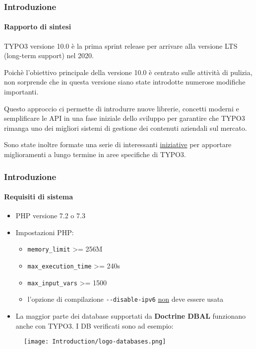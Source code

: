 \begin{frame}[fragile]
	\frametitle{Introduzione}
	\framesubtitle{Rapporto di sintesi}

	\small
		TYPO3 versione 10.0 è la prima sprint release per arrivare alla versione LTS
		(long-term support) nel 2020.

		\vspace{0.2cm}

		Poichè l'obiettivo principale della versione 10.0 è centrato sulle attività di pulizia, non
		sorprende che in questa versione siano state introdotte numerose modifiche importanti.

		\vspace{0.2cm}

		Questo approccio ci permette di introdurre nuove librerie, concetti moderni e
		semplificare le API in una fase iniziale dello sviluppo per garantire che TYPO3
		rimanga uno dei migliori sistemi  di gestione dei contenuti aziendali sul mercato.

		\vspace{0.2cm}

		Sono state inoltre formate una serie di interessanti
		\href{https://typo3.org/community/teams/typo3-development/initiatives/}{iniziative}
		per apportare miglioramenti a lungo termine in aree specifiche di TYPO3.
	\normalsize

\end{frame}


\begin{frame}[fragile]
	\frametitle{Introduzione}
	\framesubtitle{Requisiti di sistema}

	\begin{itemize}
		\item PHP versione 7.2 o 7.3
		\item Impostazioni PHP:

			\begin{itemize}
				\item \texttt{memory\_limit} >= 256M
				\item \texttt{max\_execution\_time} >= 240s
				\item \texttt{max\_input\_vars} >= 1500
				\item l'opzione di compilazione \texttt{-}\texttt{-disable-ipv6} \underline{non} deve essere usata
			\end{itemize}

		\item La maggior parte dei database supportati da \textbf{Doctrine DBAL} funzionano anche con TYPO3.
			I DB verificati sono ad esempio:
	\end{itemize}

	\begin{figure}
		\texttt{[image: Introduction/logo-databases.png]}
	\end{figure}

\end{frame}

